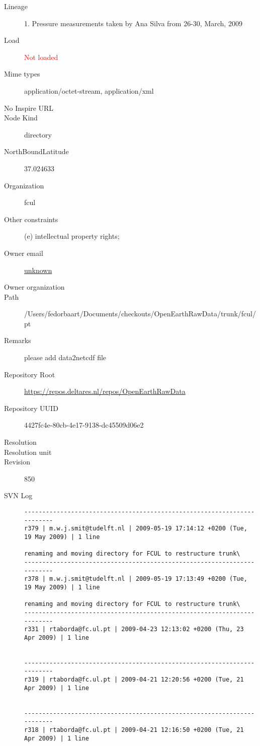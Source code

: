 \documentclass[9]{report}
\begin{document}
\begin{description}
  \item[Lineage] 1. Pressure measurements taken by Ana Silva from 26-30, March, 2009
  \item[Load] \textcolor{red}{Not loaded}
  \item[Mime types] application/octet-stream, application/xml
  \item[No Inspire URL] 
  \item[Node Kind] directory
  \item[NorthBoundLatitude] 37.024633
  \item[Organization] fcul
  \item[Other constraints] (e) intellectual property rights;
  \item[Owner email] \href{mailto:unknown}{unknown}
  \item[Owner organization] 
  \item[Path] /Users/fedorbaart/Documents/checkouts/OpenEarthRawData/trunk/fcul/pt
  \item[Remarks] please add data2netcdf file
  \item[Repository Root] \href{https://repos.deltares.nl/repos/OpenEarthRawData}{https://repos.deltares.nl/repos/OpenEarthRawData}
  \item[Repository UUID] 4427fc4e-80cb-4e17-9138-dc45509d06e2
  \item[Resolution] 
  \item[Resolution unit] 
  \item[Revision] 850
  \item[SVN Log] \begin{verbatim}
------------------------------------------------------------------------
r379 | m.w.j.smit@tudelft.nl | 2009-05-19 17:14:12 +0200 (Tue, 19 May 2009) | 1 line

renaming and moving directory for FCUL to restructure trunk\
------------------------------------------------------------------------
r378 | m.w.j.smit@tudelft.nl | 2009-05-19 17:13:49 +0200 (Tue, 19 May 2009) | 1 line

renaming and moving directory for FCUL to restructure trunk\
------------------------------------------------------------------------
r331 | rtaborda@fc.ul.pt | 2009-04-23 12:13:02 +0200 (Thu, 23 Apr 2009) | 1 line


------------------------------------------------------------------------
r319 | rtaborda@fc.ul.pt | 2009-04-21 12:20:56 +0200 (Tue, 21 Apr 2009) | 1 line


------------------------------------------------------------------------
r318 | rtaborda@fc.ul.pt | 2009-04-21 12:16:50 +0200 (Tue, 21 Apr 2009) | 1 line



\end{verbatim}
\end{description}
\end{document}
